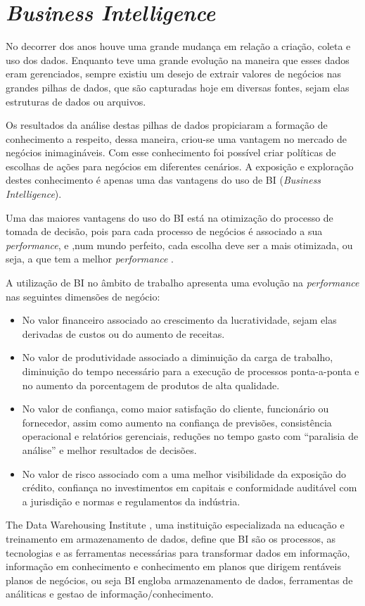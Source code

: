 \section{\textit{Business Intelligence}}
No decorrer dos anos houve uma grande mudança em relação a criação, coleta e uso dos dados. Enquanto teve uma grande evolução na maneira que esses dados eram gerenciados, sempre existiu um desejo de extrair valores de negócios nas grandes pilhas de dados, que são capturadas hoje em diversas fontes, sejam elas estruturas de dados ou arquivos.

Os resultados da análise destas pilhas de dados propiciaram a formação de conhecimento a respeito, dessa maneira, criou-se uma vantagem no mercado de negócios inimagináveis. Com esse conhecimento foi possível criar políticas de escolhas de ações para negócios em diferentes cenários. A exposição e exploração destes conhecimento é apenas uma das vantagens do uso de BI (\textit{Business Intelligence}).

Uma das maiores vantagens do uso do BI está na otimização do processo de tomada de decisão, pois para cada processo de negócios é associado a sua \textit{performance}, e ,num mundo perfeito, cada escolha deve ser a mais otimizada, ou seja, a que tem a melhor \textit{performance} \cite{business_intelligence}.

A utilização de BI no âmbito de trabalho apresenta uma evolução na \textit{performance} nas seguintes dimensões de negócio:
\begin{itemize}
		\item No valor financeiro associado ao crescimento da lucratividade, sejam elas derivadas de custos ou do aumento de receitas.
		\item No valor de produtividade associado a diminuição da carga de trabalho, diminuição do tempo necessário para a execução de processos ponta-a-ponta e no aumento da porcentagem de produtos de alta qualidade.
		\item No valor de confiança, como maior satisfação do cliente, funcionário ou fornecedor, assim como aumento na confiança de previsões, consistência operacional e relatórios gerenciais, reduções no tempo gasto com “paralisia de análise” e melhor resultados de decisões.
		\item No valor de risco associado com a uma melhor visibilidade da exposição do crédito, confiança no investimentos em capitais e conformidade auditável com a jurisdição e normas e regulamentos da indústria.
\end{itemize}
The Data Warehousing Institute \cite{tdwi}, uma instituição especializada na educação e treinamento em armazenamento de dados, define que BI são os processos, as tecnologias e as ferramentas necessárias para transformar dados em informação, informação em conhecimento e conhecimento em planos que dirigem rentáveis planos de negócios, ou seja BI engloba armazenamento de dados, ferramentas de análiticas e gestao de informação/conhecimento. 

